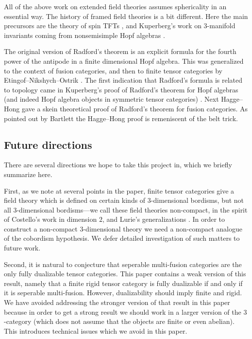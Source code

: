 \documentclass{amsart}
\begin{document}
All of the above work on extended field theories assumes sphericality in an essential way.  The history of framed field theories is a bit different.  Here the main precursors are the theory of spin TFTs \cite{MR1117149, MR1171303, MR1387228, MR1880321}, and Kuperberg's work on $3$-manifold invariants coming from nonsemisimple Hopf algebras \cite{MR1394749}.

The original version of Radford's theorem \cite{MR0407069} is an explicit formula for the fourth power of the antipode in a finite dimensional Hopf algebra.  This was generalized to the context of fusion categories, and then to finite tensor categories by Etingof--Nikshych--Ostrik \cite{MR2183279,MR2097289}.  The first indication that Radford's formula is related to topology came in Kuperberg's proof of Radford's theorem for Hopf algebras (and indeed Hopf algebra objects in symmetric tensor categories) \cite{MR1394749}.  Next Hagge--Hong \cite{MR2559711} gave a skein theoretical proof of Radford's theorem for fusion categories.  As pointed out by Bartlett \cite{0901.3975} the Hagge--Hong proof is remeniscent of the belt trick.


\subsection{Future directions}

There are several directions we hope to take this project in, which we briefly summarize here.

First, as we note at several points in the paper, finite tensor categories give a field theory which is defined on certain kinds of $3$-dimensional bordisms, but not all $3$-dimensional bordisms---we call these field theories non-compact, in the spirit of Costello's work \cite{MR2298823} in dimension $2$, and Lurie's generalizations \cite[\S 4.2]{lurie-ch}.  In order to construct a non-compact $3$-dimensional theory we need a non-compact analogue of the cobordism hypothesis.  We defer detailed investigation of such matters to future work.

Second, it is natural to conjecture that seperable multi-fusion categories are the only fully dualizable tensor categories.  This paper contains a weak version of this result, namely that a finite rigid tensor category is fully dualizable if and only if it is seperable multi-fusion.  However, dualizability should imply finite and rigid.  We have avoided addressing the stronger version of that result in this paper because in order to get a strong result we should work in a larger version of the $3$-category (which does not assume that the objects are finite or even abelian).  This introduces technical issues which we avoid in this paper.
\end{document}
